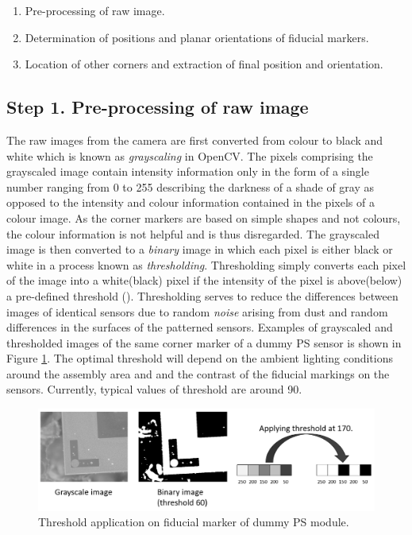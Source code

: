 \begin{enumerate}
\setlength\itemsep{-0.5em}
\item Pre-processing of raw image.
\item Determination of positions and planar orientations of fiducial markers.
\item Location of other corners and extraction of final position and orientation.
\end{enumerate}

\subsection{Step 1. Pre-processing of raw image}
The raw images from the camera are first converted from colour to black and white which is known as \emph{grayscaling} in OpenCV. The pixels comprising the grayscaled image contain intensity information only in the form of a single number ranging from 0 to 255 describing the darkness of a shade of gray as opposed to the intensity and colour information contained in the pixels of a colour image. As the corner markers are based on simple shapes and not colours, the colour information is not helpful and is thus disregarded. The grayscaled image is then converted to a \emph{binary} image in which each pixel is either black or white in a process known as \emph{thresholding}. Thresholding simply converts each pixel of the image into a white(black) pixel if the intensity of the pixel is above(below) a pre-defined threshold (). Thresholding serves to reduce the differences between images of identical sensors due to random \emph{noise} arising from dust and random differences in the surfaces of the patterned sensors. Examples of grayscaled and thresholded images of the same corner marker of a dummy PS sensor is shown in Figure \ref{fig:threshold}. The optimal threshold will depend on the ambient lighting conditions around the assembly area and and the contrast of the fiducial markings on the sensors. Currently, typical values of threshold are around 90.

\begin{figure}[ht]\centering
\includegraphics[width=0.9\linewidth]{Data/Control_Software/Threshold.png}
\caption{Threshold application on fiducial marker of dummy PS module.}
\label{fig:threshold}
\end{figure}

